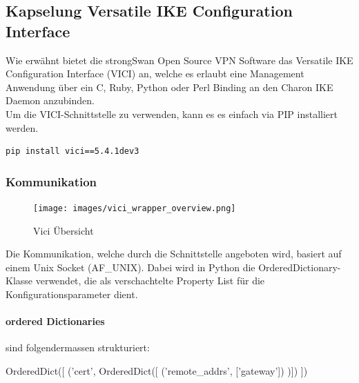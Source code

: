 \subsection{Kapselung Versatile IKE Configuration Interface}
Wie erwähnt bietet die strongSwan Open Source VPN Software das Versatile
IKE Configuration Interface (VICI) \cite{vici} an, welche es erlaubt eine Management Anwendung über ein C, Ruby, Python oder Perl Binding an den Charon
IKE Daemon anzubinden.\\
Um die VICI-Schnittstelle zu verwenden, kann es es einfach via PIP installiert werden.\\
\begin{lstlisting}[style=BashInputStyle]
	pip install vici==5.4.1dev3
\end{lstlisting}
\medskip

\subsubsection{Kommunikation}
\noindent
\begin{minipage}[t]{0.5\textwidth}
    \vspace{0pt}
    \begin{figure}[H]
        \centering
        \texttt{[image: images/vici\_wrapper\_overview.png]}
        \caption[VICI Übersicht]{Vici Übersicht}
    \end{figure}
    \hfill
\end{minipage}   
\noindent\begin{minipage}[t]{0.5\textwidth}
\vspace{0pt}
Die Kommunikation, welche durch die Schnittstelle angeboten wird, basiert auf einem Unix Socket (AF\_UNIX). Dabei wird in Python die OrderedDictionary-Klasse verwendet, die als verschachtelte Property List für die Konfigurationsparameter dient. \\
\end{minipage}
\hfill


\paragraph{ordered Dictionaries}\label{orderedDictionary}sind folgendermassen strukturiert:
\begin{python}
OrderedDict([
	('cert', OrderedDict([
		('remote_addrs', ['gateway'])
	)])
])
\end{python}

